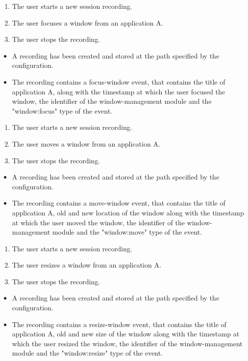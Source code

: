 \begin{tests}
	{\begin{enumerate}
		\item The user starts a new session recording.
		\item The user focuses a window from an application A.
		\item The user stops the recording.
	\end{enumerate}}
	{\begin{itemize}
		\item A recording has been created and stored at the path specified by the configuration.
		\item The recording contains a focus-window event, that contains the title of application A, along with the timestamp at which the user focused the window, the identifier of the window-management module and the "window:focus" type of the event.
	\end{itemize}}
	
	{\begin{enumerate}
		\item The user starts a new session recording.
		\item The user moves a window from an application A.
		\item The user stops the recording.
	\end{enumerate}}
	{\begin{itemize}
		\item A recording has been created and stored at the path specified by the configuration.
		\item The recording contains a move-window event, that contains the title of application A, old and new location of the window along with the timestamp at which the user moved the window, the identifier of the window-management module and the "window:move" type of the event.
	\end{itemize}}
	
	{\begin{enumerate}
		\item The user starts a new session recording.
		\item The user resizes a window from an application A.
		\item The user stops the recording.
	\end{enumerate}}
	{\begin{itemize}
		\item A recording has been created and stored at the path specified by the configuration.
		\item The recording contains a resize-window event, that contains the title of application A, old and new size of the window along with the timestamp at which the user resized the window, the identifier of the window-management module and the "window:resize" type of the event.
	\end{itemize}}
	

\end{tests}
